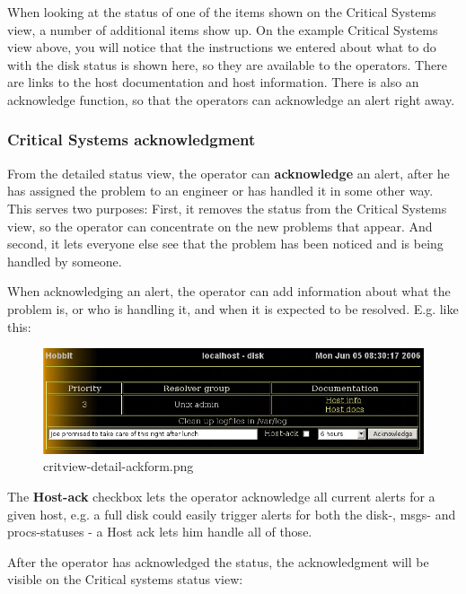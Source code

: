 When looking at the status of one of the items shown on the Critical
 Systems view, a number of additional items show up. On the example
 Critical Systems view above, you will notice that the instructions we
 entered about what to do with the disk status is shown here, so they
 are available to the operators. There are links to the host
 documentation and host information. There is also an acknowledge
 function, so that the operators can acknowledge an alert right away.

\subsubsection{Critical Systems acknowledgment}


 From the detailed status view, the operator can \textbf{acknowledge}
 an alert, after he has assigned the problem to an engineer or has
 handled it in some other way. This serves two purposes: First, it
 removes the status from the Critical Systems view, so the operator
 can concentrate on the new problems that appear. And second, it lets
 everyone else see that the problem has been noticed and is being
 handled by someone.



 When acknowledging an alert, the operator can add information about
 what the problem is, or who is handling it, and when it is expected
 to be resolved. E.g. like this: 

\begin{figure} \centering \caption{critview-detail-ackform.png}\label{critview-detail-ackform.png}
\includegraphics[scale=0.5]{./critview-detail-ackform.png} 
\end{figure}

 The \textbf{Host-ack} checkbox lets the operator acknowledge all
 current alerts for a given host, e.g. a full disk could easily
 trigger alerts for both the disk-, msgs- and procs-statuses - a Host
 ack lets him handle all of those.



 After the operator has acknowledged the status, the acknowledgment
 will be visible on the Critical systems status view: 

